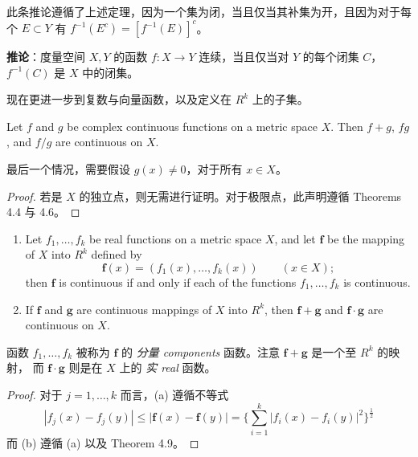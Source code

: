 \documentclass[../poma-notes.tex]{subfiles}
\begin{document}
此条推论遵循了上述定理，因为一个集为闭，当且仅当其补集为开，且因为对于每个 $E \subset Y$ 有 $f^{-1}(E^c) = [f^{-1}(E)]^c$。

\begin{anote}
  \textbf{推论}：度量空间 $X, Y$ 的函数 $f: X \to Y$ 连续，当且仅当对 $Y$ 的每个闭集 $C$，$f^{-1}(C)$ 是 $X$ 中的闭集。
\end{anote}

现在更进一步到复数与向量函数，以及定义在 $R^k$ 上的子集。

\begin{theorem}
  Let $f$ and $g$ be complex continuous functions on a metric space $X$. Then $f + g$, $fg$, and $f/g$ are
  continuous on $X$.
\end{theorem}

最后一个情况，需要假设 $g(x) \ne 0$，对于所有 $x \in X$。

\begin{proof}
  若是 $X$ 的独立点，则无需进行证明。对于极限点，此声明遵循 Theorems 4.4 与 4.6。
\end{proof}

\begin{theorem}\mbox{}\par
  \begin{enumerate}[label=(\alph*)]
    \item Let $f_1, \dots, f_k$ be real functions on a metric space $X$, and let $\pmb{f}$ be the mapping of
          $X$ into $R^k$ defined by
          \begin{equation}
            \mathbf{f}(x) = (f_1(x),\dots,f_k(x)) \qquad (x \in X);
          \end{equation}
          then $\mathbf{f}$ is continuous if and only if each of the functions $f_1,\dots,f_k$ is continuous.
    \item If $\mathbf{f}$ and $\mathbf{g}$ are continuous mappings of $X$ into $R^k$, then $\mathbf{f + g}$
          and $\mathbf{f \cdot g}$ are continuous on $X$.
  \end{enumerate}
\end{theorem}

函数 $f_1,\dots,f_k$ 被称为 $\mathbf{f}$ 的 \textit{分量 components} 函数。注意 $\mathbf{f + g}$ 是一个至 $R^k$ 的映射，
而 $\mathbf{f \cdot g}$ 则是在 $X$ 上的 \textit{实 real} 函数。

\begin{proof}
  对于 $j = 1,\dots,k$ 而言，(a) 遵循不等式
  \[
    |f_j(x) - f_j(y)| \le |\mathbf{f}(x) - \mathbf{f}(y)| =
    \biggl\{ \sum_{i=1}^k |f_i(x) - f_i(y)|^2 \biggr\}^{\frac{1}{2}}
  \]
  而 (b) 遵循 (a) 以及 Theorem 4.9。
\end{proof}

\end{document}
